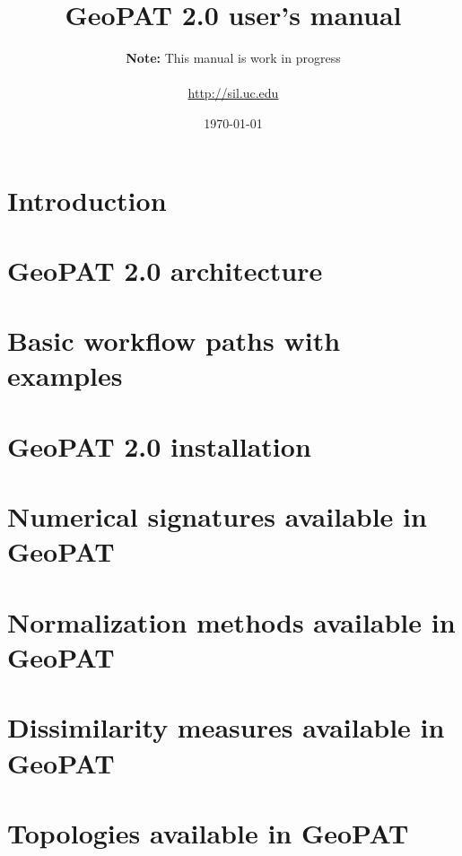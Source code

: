 \documentclass[12pt,margin=0.5in]{article}
\title{GeoPAT 2.0 user's manual}
\author{{\bf Note:} This manual is work in progress \\ \\ \url{http://sil.uc.edu}}
\date{\today}
\begin{document}
\maketitle
\newpage

\tableofcontents
\newpage

\section{Introduction}


\section{GeoPAT 2.0 architecture}


\section{Basic workflow paths with examples}


\FloatBarrier

\begin{appendices}

\section{GeoPAT 2.0 installation}


\section{Numerical signatures available in GeoPAT \label{signatures}} 


\section{Normalization methods available in GeoPAT \label{normalization}} 


\section{Dissimilarity measures available in GeoPAT \label{measures}}


\section{Topologies available in GeoPAT \label{topology}}


\end{appendices}

\newpage

\printbibliography[heading=bibintoc,title={References}]
\end{document}
